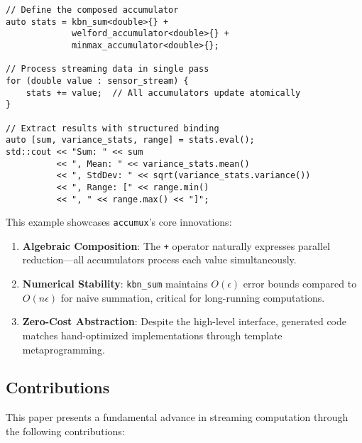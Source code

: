 \documentclass[sigconf]{acmart}
\newcommand{\accumux}{\texttt{accumux}\xspace}
\begin{document}
\begin{lstlisting}[caption={Composing multiple accumulators algebraically},label={lst:motivation}]
// Define the composed accumulator
auto stats = kbn_sum<double>{} +
             welford_accumulator<double>{} +
             minmax_accumulator<double>{};

// Process streaming data in single pass
for (double value : sensor_stream) {
    stats += value;  // All accumulators update atomically
}

// Extract results with structured binding
auto [sum, variance_stats, range] = stats.eval();
std::cout << "Sum: " << sum
          << ", Mean: " << variance_stats.mean()
          << ", StdDev: " << sqrt(variance_stats.variance())
          << ", Range: [" << range.min()
          << ", " << range.max() << "]";
\end{lstlisting}

This example showcases \accumux's core innovations:
\begin{enumerate}
\item \textbf{Algebraic Composition}: The \texttt{+} operator naturally expresses parallel reduction---all accumulators process each value simultaneously.
\item \textbf{Numerical Stability}: \texttt{kbn\_sum} maintains $O(\epsilon)$ error bounds compared to $O(n\epsilon)$ for naive summation, critical for long-running computations.
\item \textbf{Zero-Cost Abstraction}: Despite the high-level interface, generated code matches hand-optimized implementations through template metaprogramming.
\end{enumerate}

\subsection{Contributions}

This paper presents a fundamental advance in streaming computation through the following contributions:
\end{document}
